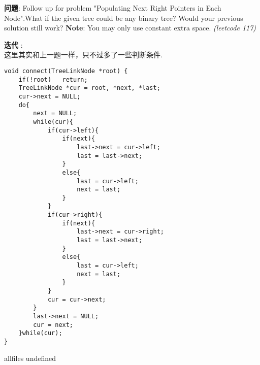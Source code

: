 \documentclass{article}
\begin{document}
\begin{CJK}{UTF8}{gbsn}     %

\else
	
\begin{description}
	\item{\textbf{问题}}: Follow up for problem "Populating Next Right Pointers in Each Node".What if the given tree could be any binary tree? Would your previous solution still work?
	\textbf{Note}: You may only use constant extra space. \textit{(leetcode 117)}
	\item{\textbf{迭代}} : 
	\\这里其实和上一题一样，只不过多了一些判断条件.
	\begin{lstlisting}
void connect(TreeLinkNode *root) {
	if(!root)	return;
	TreeLinkNode *cur = root, *next, *last;
	cur->next = NULL;
	do{
		next = NULL;
		while(cur){
			if(cur->left){
				if(next){
					last->next = cur->left;
					last = last->next;
				}
				else{
					last = cur->left;
					next = last;
				}
			}
			if(cur->right){
				if(next){
					last->next = cur->right;
					last = last->next;
				}
				else{
					last = cur->left;
					next = last;
				}
			}
			cur = cur->next;
		}
		last->next = NULL;
		cur = next;
	}while(cur);
}
	\end{lstlisting}
	\textit{}
\end{description}

\fi

\ifx allfiles undefined
\end{CJK}
\end{document}
